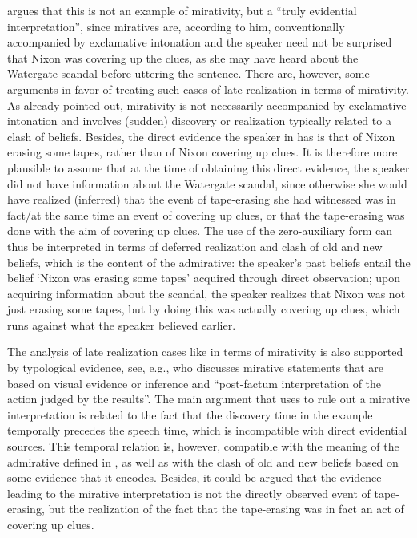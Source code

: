 \documentclass[output=paper]{langscibook}
\begin{document}
\noindent \citet[4]{Koev2017} argues that this is not an example of mirativity, but a ``truly evidential interpretation'', since miratives are, according to him, conventionally accompanied by exclamative intonation and the speaker need not be surprised that Nixon was covering up the clues, as she may have heard about the Watergate scandal before uttering the sentence.
There are, however, some arguments in favor of treating such cases of late realization in terms of mirativity. As already pointed out, mirativity is not necessarily accompanied by exclamative intonation and involves (sudden) discovery or realization typically related to a clash of beliefs.
Besides, the direct evidence the speaker in  has is that of Nixon erasing some tapes, rather than of Nixon covering up clues. It is therefore more plausible to assume that at the time of obtaining this direct evidence, the speaker did not have information about the Watergate scandal, since otherwise she would have realized (inferred) that the event of tape-erasing she had witnessed was in fact/at the same time an event of covering up clues, or that the tape-erasing was done with the aim of covering up clues.
The use of the zero-auxiliary form can thus be interpreted in terms of deferred realization and clash of old and new beliefs, which is the content of the admirative: the speaker's past beliefs entail the belief `Nixon was erasing some tapes' acquired through direct observation; upon acquiring information about the scandal, the speaker realizes that Nixon was not just erasing some tapes, but by doing this was actually covering up clues, which runs against what the speaker believed earlier.

The analysis of late realization cases like  in terms of mirativity is also supported by typological evidence, see, e.g., \citet[441]{Aikhenvald2012} who discusses mirative statements that are based on visual evidence or inference and ``post-factum interpretation of the action judged by the results''.
The main argument that \citeauthor{Koev2017} uses to rule out a mirative interpretation is related to the fact that the discovery time in the example temporally precedes the speech time, which is incompatible with direct evidential sources. This temporal relation is, however, compatible with the meaning of the admirative defined in , as well as with the clash of old and new beliefs based on some evidence that it encodes. Besides, it could be argued that the evidence leading to the mirative interpretation is not the directly observed event of tape-erasing, but the realization of the fact that the tape-erasing was in fact an act of covering up clues.
\end{document}
